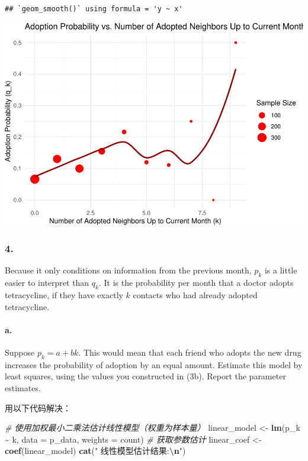 \documentclass[
]{article}
\newenvironment{Shaded}{\begin{snugshade}}{\end{snugshade}}
\newcommand{\AttributeTok}[1]{\textcolor[rgb]{0.13,0.29,0.53}{#1}}
\newcommand{\CommentTok}[1]{\textcolor[rgb]{0.56,0.35,0.01}{\textit{#1}}}
\newcommand{\FunctionTok}[1]{\textcolor[rgb]{0.13,0.29,0.53}{\textbf{#1}}}
\newcommand{\NormalTok}[1]{#1}
\newcommand{\OtherTok}[1]{\textcolor[rgb]{0.56,0.35,0.01}{#1}}
\newcommand{\SpecialCharTok}[1]{\textcolor[rgb]{0.81,0.36,0.00}{\textbf{#1}}}
\newcommand{\StringTok}[1]{\textcolor[rgb]{0.31,0.60,0.02}{#1}}
\begin{document}
\begin{verbatim}
## `geom_smooth()` using formula = 'y ~ x'
\end{verbatim}

\includegraphics{Homework-04_files/figure-latex/unnamed-chunk-4-1.pdf}

\subsubsection{4.}\label{section-3}

Because it only conditions on information from the previous month,
\(p_k\) is a little easier to interpret than \(q_k\). It is the
probability per month that a doctor adopts tetracycline, if they have
exactly \(k\) contacts who had already adopted tetracycline.

\paragraph{a.}\label{a.-1}

Suppose \(p_k = a + bk\). This would mean that each friend who adopts
the new drug increases the probability of adoption by an equal amount.
Estimate this model by least squares, using the values you constructed
in (3b). Report the parameter estimates.

用以下代码解决：

\begin{Shaded}
\begin{Highlighting}[]
\CommentTok{\# 使用加权最小二乘法估计线性模型（权重为样本量）}
\NormalTok{linear\_model }\OtherTok{\textless{}{-}} \FunctionTok{lm}\NormalTok{(p\_k }\SpecialCharTok{\textasciitilde{}}\NormalTok{ k, }\AttributeTok{data =}\NormalTok{ p\_data, }\AttributeTok{weights =}\NormalTok{ count)}
\CommentTok{\# 获取参数估计}
\NormalTok{linear\_coef }\OtherTok{\textless{}{-}} \FunctionTok{coef}\NormalTok{(linear\_model)}
\FunctionTok{cat}\NormalTok{(}\StringTok{" 线性模型估计结果:}\SpecialCharTok{\textbackslash{}n}\StringTok{"}\NormalTok{)}
\end{Highlighting}
\end{Shaded}
\end{document}
